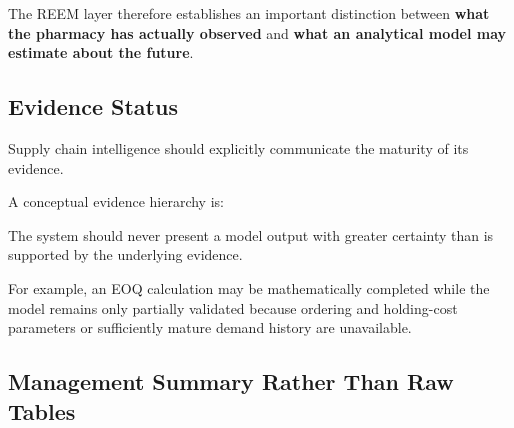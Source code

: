 \documentclass[12pt]{article}
\begin{document}
The REEM layer therefore establishes an important distinction between
\textbf{what the pharmacy has actually observed} and \textbf{what an analytical
model may estimate about the future}.

\subsection{Evidence Status}

Supply chain intelligence should explicitly communicate the maturity of its
evidence.

A conceptual evidence hierarchy is:

\begin{center}
\end{center}

The system should never present a model output with greater certainty than is
supported by the underlying evidence.

For example, an EOQ calculation may be mathematically completed while the
model remains only partially validated because ordering and holding-cost
parameters or sufficiently mature demand history are unavailable.

\subsection{Management Summary Rather Than Raw Tables}
\end{document}
